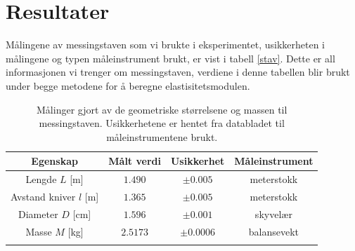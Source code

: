 \documentclass[%
 reprint,
nofootinbib,
aps,
]{revtex4-1}
\begin{document}
\section{Resultater}
Målingene av messingstaven som vi brukte i eksperimentet, usikkerheten i målingene og typen måleinstrument brukt, er vist i tabell \vref{stav}. Dette er all informasjonen vi trenger om messingstaven, verdiene i denne tabellen blir brukt under begge metodene for å beregne elastisitetsmodulen.
\begin{table}[h!]
\centering
\caption{Målinger gjort av de geometriske størrelsene og massen til messingstaven. Usikkerhetene er hentet fra databladet til måleinstrumentene brukt.}
\label{stav}
\begin{tabular}{cccc}
    Egenskap & Målt verdi      &    Usikkerhet & Måleinstrument \\
    \toprule
    Lengde $L$ [m] & $1.490$    & $\pm 0.005$  & meterstokk  \\
    Avstand kniver $l$ [m] & $1.365$ & $\pm0.005$ & meterstokk \\
    Diameter $D$ [cm] & $1.596$    & $\pm0.001$ & skyvelær    \\
    Masse $M$    [kg]  & $2.5173$   & $\pm0.0006$   & balansevekt \\  \botrule
\end{tabular}
\end{table}
\end{document}
